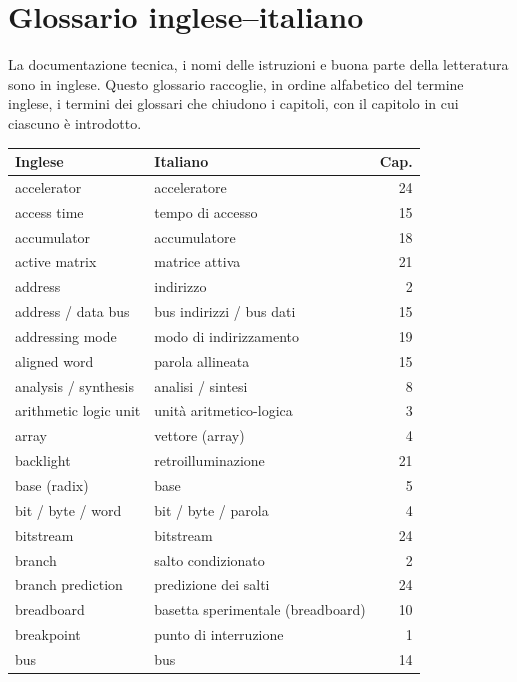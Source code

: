 \chapter{Glossario inglese--italiano}
\label{app:glossary}

La documentazione tecnica, i nomi delle istruzioni e buona parte della
letteratura sono in inglese. Questo glossario raccoglie, in ordine alfabetico
del termine inglese, i termini dei glossari che chiudono i capitoli, con il
capitolo in cui ciascuno è introdotto.

{\small
\begin{longtable}{@{}p{}p{}r@{}}
\toprule
\textbf{Inglese} & \textbf{Italiano} & \textbf{Cap.}\\
\midrule
\endhead
\bottomrule
\endfoot
accelerator & acceleratore & 24\\
access time & tempo di accesso & 15\\
accumulator & accumulatore & 18\\
active matrix & matrice attiva & 21\\
address & indirizzo & 2\\
address / data bus & bus indirizzi / bus dati & 15\\
addressing mode & modo di indirizzamento & 19\\
aligned word & parola allineata & 15\\
analysis / synthesis & analisi / sintesi & 8\\
arithmetic logic unit & unità aritmetico-logica & 3\\
array & vettore (array) & 4\\
backlight & retroilluminazione & 21\\
base (radix) & base & 5\\
bit / byte / word & bit / byte / parola & 4\\
bitstream & bitstream & 24\\
branch & salto condizionato & 2\\
branch prediction & predizione dei salti & 24\\
breadboard & basetta sperimentale (breadboard) & 10\\
breakpoint & punto di interruzione & 1\\
bus & bus & 14\\

\end{longtable}}
